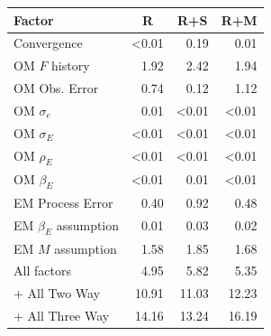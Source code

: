 \begin{center}
\begin{tabular}{lrrr}
\hline\hline
\multicolumn{1}{l}{Factor}&\multicolumn{1}{c}{R}&\multicolumn{1}{c}{R+S}&\multicolumn{1}{c}{R+M}\tabularnewline
\hline
Convergence&\textless  0.01& 0.19& 0.01\tabularnewline
OM $F$ history& 1.92& 2.42& 1.94\tabularnewline
OM Obs. Error& 0.74& 0.12& 1.12\tabularnewline
OM $\sigma_e$& 0.01&\textless  0.01&\textless  0.01\tabularnewline
OM $\sigma_E$&\textless  0.01&\textless  0.01&\textless  0.01\tabularnewline
OM $\rho_{E}$&\textless  0.01&\textless  0.01&\textless  0.01\tabularnewline
OM $\beta_{E}$&\textless  0.01& 0.01&\textless  0.01\tabularnewline
EM Process Error& 0.40& 0.92& 0.48\tabularnewline
EM $\beta_{E}$ assumption& 0.01& 0.03& 0.02\tabularnewline
EM $M$ assumption& 1.58& 1.85& 1.68\tabularnewline
All factors& 4.95& 5.82& 5.35\tabularnewline
+ All Two Way&10.91&11.03&12.23\tabularnewline
+ All Three Way&14.16&13.24&16.19\tabularnewline
\hline
\end{tabular}\end{center}
